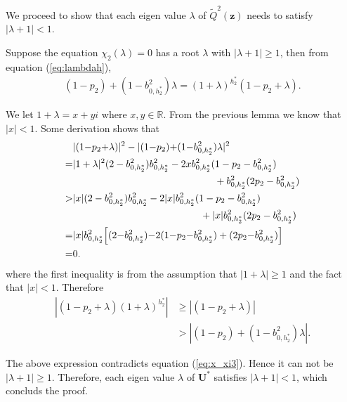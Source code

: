 \documentclass[11pt,twocolumn]{IEEEtran}
\begin{document}
We proceed to show that each eigen value $\lambda$ of $\tilde{Q}^2(\bm z)$ needs to satisfy $\big| \lambda+1 \big|<1$.
\vspace{3pt}

Suppose the equation $\chi_2(\lambda)=0$ has a root $\lambda$ with $\big|\lambda+1\big|\geq 1$, then from equation (\ref{eq:lambdah}),
\begin{align}
\label{eq:x_xi3}
(1{-}p_2){+}(1{-}b_{0, h^*_2}^2)\lambda {=}(1{+}\lambda)^{h^*_2} (1{-}p_2{+}\lambda).
\end{align}

We let $1+\lambda=x+yi$ where $x,y \in \mathbb{R}$. From the previous lemma we know that $|x|<1$. Some derivation shows that
\begin{align}
&|(1{-}p_2{+}\lambda)|^2 - |(1{-}p_2){+}(1{-}b_{0, h^*_2}^2)\lambda|^2 \nonumber \\
=& |1+\lambda|^2(2-b_{0, h^*_2}^2)b_{0, h^*_2}^2-2 x b_{0, h^*_2}^2 (1-p_2-b_{0, h^*_2}^2)\nonumber\\
&\hspace{2in}+b_{0, h^*_2}^2 (2p_2-b_{0, h^*_2}^2) \nonumber \\
> & |x| (2-b_{0, h^*_2}^2)b_{0, h^*_2}^2-2 |x| b_{0, h^*_2}^2 (1-p_2-b_{0, h^*_2}^2)\nonumber\\
&\hspace{1.8in}+|x| b_{0, h^*_2}^2 (2p_2-b_{0, h^*_2}^2) \nonumber \\
=& |x|b_{0, h^*_2}^2\Big[ (2{-}b_{0, h^*_2}^2){-}2 (1{-}p_2{-}b_{0, h^*_2}^2) +(2p_2{-}b_{0, h^*_2}^2) \Big] \nonumber \\
=& 0. \nonumber
\end{align}
where the first inequality is from the assumption that $|1+\lambda|\geq 1$ and the fact that $|x|<1$. Therefore
\begin{align}
|(1{-}p_2{+}\lambda) (1+\lambda)^{h^*_2} | & \geq |(1{-}p_2{+}\lambda) | \nonumber \\
&> |(1{-}p_2){+}(1{-}b_{0, h^*_2}^2)\lambda|. \nonumber
\end{align}

The above expression contradicts equation (\ref{eq:x_xi3}). Hence it can not be $\big|\lambda+1\big|\geq 1$. Therefore, each eigen value $\lambda$ of $\bm U^*$ satisfies $\big|\lambda+1\big|< 1$, which concluds the proof.
\end{document}
